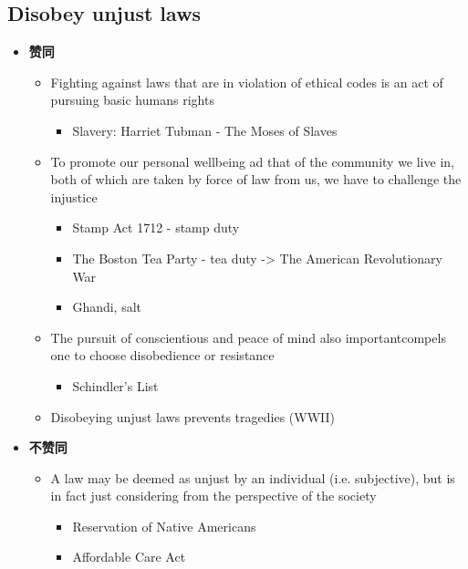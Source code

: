\documentclass{article}
\begin{document}
    \subsection{Disobey unjust laws}

      \begin{itemize}
        \item \textbf{赞同}
        \begin{itemize}
          \item Fighting against laws that are in violation of ethical codes
          is an act of pursuing basic humans rights
          \begin{itemize}
            \item Slavery: Harriet Tubman - The Moses of Slaves
          \end{itemize}

          \item To promote our personal wellbeing ad that of the community we
          live in, both of which are taken by force of law from us, we have to
          challenge the injustice
          \begin{itemize}
            \item Stamp Act 1712 - stamp duty
            \item The Boston Tea Party - tea duty -> The American
            Revolutionary War
            \item Ghandi, salt
          \end{itemize}

          \item The pursuit of conscientious and peace of mind also
          important{compels one to choose disobedience or resistance}
          \begin{itemize}
            \item Schindler’s List
          \end{itemize}

          \item Disobeying unjust laws prevents tragedies (WWII)
        \end{itemize}

        \item \textbf{不赞同}
        \begin{itemize}
          \item A law may be deemed as unjust by an individual
          (i.e. subjective), but is in fact just considering from the
          perspective of the society
          \begin{itemize}
            \item Reservation of Native Americans
            \item Affordable Care Act
          \end{itemize}


\end{itemize}
\end{itemize}
\end{document}
